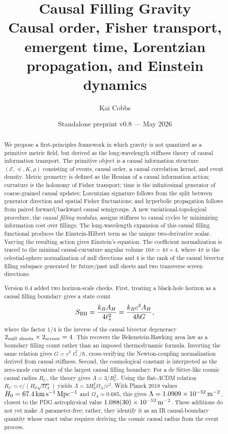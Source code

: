 \documentclass[11pt]{article}
\title{Causal Filling Gravity\\
\large Causal order, Fisher transport, emergent time, Lorentzian propagation, and Einstein dynamics}
\author{Kai Cobbs}
\date{Standalone preprint v0.8 --- May 2026}
\newcommand{\E}{\mathcal E}
\newcommand{\pre}{\preceq}
\begin{document}
\maketitle



\begin{abstract}
We propose a first-principles framework in which gravity is not quantized as a primitive metric field, but derived as the long-wavelength stiffness theory of causal information transport. The primitive object is a causal information structure $(\E,\pre,K,\rho)$ consisting of events, causal order, a causal correlation kernel, and event density. Metric geometry is defined as the Hessian of a causal information action; curvature is the holonomy of Fisher transport; time is the infinitesimal generator of coarse-grained causal updates; Lorentzian signature follows from the split between generator direction and spatial Fisher fluctuations; and hyperbolic propagation follows from paired forward/backward causal semigroups. A new variational-topological procedure, the \emph{causal filling modulus}, assigns stiffness to causal cycles by minimizing information cost over fillings. The long-wavelength expansion of this causal filling functional produces the Einstein-Hilbert term as the unique two-derivative scalar. Varying the resulting action gives Einstein's equation. The coefficient normalization is traced to the minimal causal-curvature angular volume $16\pi=4\pi\times 4$, where $4\pi$ is the celestial-sphere normalization of null directions and $4$ is the rank of the causal bivector filling subspace generated by future/past null sheets and two transverse screen directions.

Version 0.4 added two horizon-scale checks. First, treating a black-hole horizon as a causal filling boundary gives a state count
\[
S_{\rm BH}=\frac{k_B A_H}{4\ell_*^2}=\frac{k_Bc^3A_H}{4\hbar G},
\]
where the factor $1/4$ is the inverse of the causal bivector degeneracy $2_{\rm null\ sheets}\times2_{\rm screen}=4$. This recovers the Bekenstein-Hawking area law as a boundary filling count rather than an imposed thermodynamic formula. Inverting the same relation gives $G=c^3\ell_*^2/\hbar$, cross-verifying the Newton-coupling normalization derived from causal stiffness. Second, the cosmological constant is interpreted as the zero-mode curvature of the largest causal filling boundary. For a de Sitter-like cosmic causal radius $R_C$, the theory gives $\Lambda=3/R_C^2$. Using the flat-$\Lambda$CDM relation $R_C=c/(H_0\sqrt{\Omega_\Lambda})$ yields $\Lambda=3H_0^2\Omega_\Lambda/c^2$. With Planck 2018 values $H_0=67.4\,{\rm km\,s^{-1}\,Mpc^{-1}}$ and $\Omega_\Lambda\simeq0.685$, this gives $\Lambda=1.0909\times10^{-52}\,{\rm m^{-2}}$, closest to the PDG astrophysical value $1.088(30)\times10^{-52}\,{\rm m^{-2}}$. These additions do not yet make $\Lambda$ parameter-free; rather, they identify it as an IR causal-boundary quantity whose exact value requires deriving the cosmic causal radius from the event process.


\end{abstract}
\end{document}

